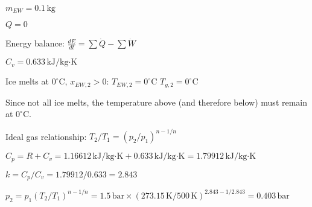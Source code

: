 \( m_{EW} = 0.1 \, \text{kg} \)  

\( Q = 0 \)  

Energy balance:  
\( \frac{dE}{dt} = \sum \dot{Q} - \sum \dot{W} \)  

\( C_v = 0.633 \, \text{kJ/kg·K} \)  

Ice melts at \( 0^\circ \text{C} \), \( x_{EW,2} > 0 \):  
\( T_{EW,2} = 0^\circ \text{C} \)  
\( T_{g,2} = 0^\circ \text{C} \)  

Since not all ice melts, the temperature above (and therefore below) must remain at \( 0^\circ \text{C} \).  

Ideal gas relationship:  
\( T_2 / T_1 = (p_2 / p_1)^{n-1/n} \)  

\( C_p = R + C_v = 1.16612 \, \text{kJ/kg·K} + 0.633 \, \text{kJ/kg·K} = 1.79912 \, \text{kJ/kg·K} \)  

\( k = C_p / C_v = 1.79912 / 0.633 = 2.843 \)  

\( p_2 = p_1 (T_2 / T_1)^{n-1/n} = 1.5 \, \text{bar} \times (273.15 \, \text{K} / 500 \, \text{K})^{2.843-1/2.843} = 0.403 \, \text{bar} \)